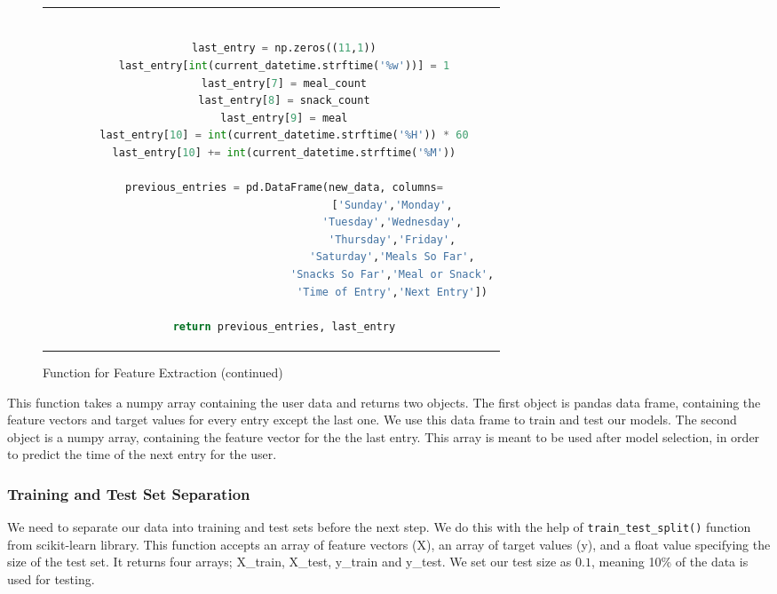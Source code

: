 \begin{figure}
  \ContinuedFloat
  \begin{tabular}{c}
  \begin{lstlisting}[language=python, breaklines, breakatwhitespace]

    last_entry = np.zeros((11,1))
    last_entry[int(current_datetime.strftime('%w'))] = 1
    last_entry[7] = meal_count
    last_entry[8] = snack_count
    last_entry[9] = meal
    last_entry[10] = int(current_datetime.strftime('%H')) * 60
    last_entry[10] += int(current_datetime.strftime('%M'))

    previous_entries = pd.DataFrame(new_data, columns=
                                      ['Sunday','Monday',
                                      'Tuesday','Wednesday',
                                      'Thursday','Friday',
                                      'Saturday','Meals So Far',
                                      'Snacks So Far','Meal or Snack',
                                      'Time of Entry','Next Entry'])

    return previous_entries, last_entry

  \end{lstlisting}
  \end{tabular}
  \caption[]{Function for Feature Extraction (continued)}
\end{figure}
\newpage
This function takes a numpy array containing the user data and returns two objects.
The first object is pandas data frame, containing the feature vectors and target values for every entry except the last one.
We use this data frame to train and test our models.
The second object is a numpy array, containing the feature vector for the the last entry.
This array is meant to be used after model selection, in order to predict the time of the next entry for the user.

\subsubsection{Training and Test Set Separation}
We need to separate our data into training and test sets before the next step.
We do this with the help of \texttt{train\_test\_split()} function from scikit-learn library.
This function accepts an array of feature vectors (X), an array of target values (y), and a float value specifying the size of the test set.
It returns four arrays; X\_train, X\_test, y\_train and y\_test.
We set our test size as $0.1$, meaning 10\% of the data is used for testing.

